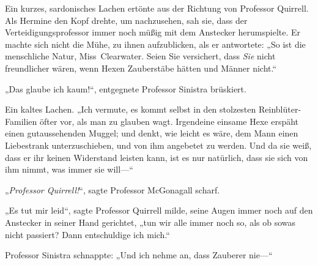 Ein kurzes, sardonisches Lachen ertönte aus der Richtung von Professor Quirrell. Als Hermine den Kopf drehte, um nachzusehen, sah sie, dass der Verteidigungsprofessor immer noch müßig mit dem Anstecker herumspielte. Er machte sich nicht die Mühe, zu ihnen aufzublicken, als er antwortete: „So ist die menschliche Natur, Miss~Clearwater. Seien Sie versichert, dass \emph{Sie} nicht freundlicher wären, wenn Hexen Zauberstäbe hätten und Männer nicht.“

„Das glaube ich kaum!“, entgegnete Professor Sinistra brüskiert.

Ein kaltes Lachen. „Ich vermute, es kommt selbst in den stolzesten Reinblüter-Familien öfter vor, als man zu glauben wagt. Irgendeine einsame Hexe erspäht einen gutaussehenden Muggel; und denkt, wie leicht es wäre, dem Mann einen Liebestrank unterzuschieben, und von ihm angebetet zu werden. Und da sie weiß, dass er ihr keinen Widerstand leisten kann, ist es nur natürlich, dass sie sich von ihm nimmt, was immer sie will—“

„\emph{Professor Quirrell!}“, sagte Professor McGonagall scharf.

„Es tut mir leid“, sagte Professor Quirrell milde, seine Augen immer noch auf den Anstecker in seiner Hand gerichtet, „tun wir alle immer noch so, als ob sowas nicht passiert? Dann entschuldige ich mich.“

Professor Sinistra schnappte: „Und ich nehme an, dass Zauberer nie—“

